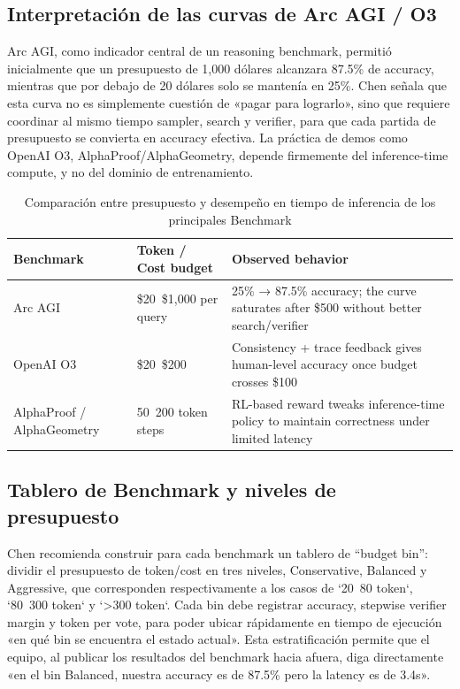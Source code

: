 \documentclass[a4paper]{article}
\begin{document}
\subsection{Interpretación de las curvas de Arc AGI / O3}
Arc AGI, como indicador central de un reasoning benchmark, permitió inicialmente que un presupuesto de 1,000 dólares alcanzara 87.5\% de accuracy, mientras que por debajo de 20 dólares solo se mantenía en 25\%. Chen señala que esta curva no es simplemente cuestión de «pagar para lograrlo», sino que requiere coordinar al mismo tiempo sampler, search y verifier, para que cada partida de presupuesto se convierta en accuracy efectiva. La práctica de demos como OpenAI O3, AlphaProof/AlphaGeometry, depende firmemente del inference-time compute, y no del dominio de entrenamiento.

\begin{table}[H]
\centering
\caption{Comparación entre presupuesto y desempeño en tiempo de inferencia de los principales Benchmark}
\begin{tabular}{p{}p{}p{}}
\toprule
Benchmark & Token / Cost budget & Observed behavior \\
\midrule
Arc AGI & \$20~\$1,000 per query & 25\% → 87.5\% accuracy; the curve saturates after \$500 without better search/verifier \\
OpenAI O3 & \$20~\$200 & Consistency + trace feedback gives human-level accuracy once budget crosses \$100 \\
AlphaProof / AlphaGeometry & 50~200 token steps & RL-based reward tweaks inference-time policy to maintain correctness under limited latency \\
\bottomrule
\end{tabular}
\end{table}

\subsection{Tablero de Benchmark y niveles de presupuesto}
Chen recomienda construir para cada benchmark un tablero de ``budget bin'': dividir el presupuesto de token/cost en tres niveles, Conservative, Balanced y Aggressive, que corresponden respectivamente a los casos de `20~80 token`, `80~300 token` y `>300 token`. Cada bin debe registrar accuracy, stepwise verifier margin y token per vote, para poder ubicar rápidamente en tiempo de ejecución «en qué bin se encuentra el estado actual». Esta estratificación permite que el equipo, al publicar los resultados del benchmark hacia afuera, diga directamente «en el bin Balanced, nuestra accuracy es de 87.5\% pero la latency es de 3.4s».
\end{document}
